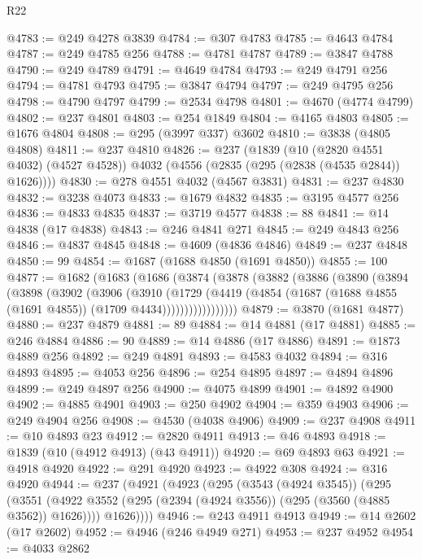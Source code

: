\begin{lexlean}{R22}
\begin{coremodule}
@4783 := @249 @4278 @3839
@4784 := @307 @4783
@4785 := @4643 @4784
@4787 := @249 @4785 @256
@4788 := @4781 @4787
@4789 := @3847 @4788
@4790 := @249 @4789
@4791 := @4649 @4784
@4793 := @249 @4791 @256
@4794 := @4781 @4793
@4795 := @3847 @4794
@4797 := @249 @4795 @256
@4798 := @4790 @4797
@4799 := @2534 @4798
@4801 := @4670 (@4774 @4799)
@4802 := @237 @4801
@4803 := @254 @1849
@4804 := @4165 @4803
@4805 := @1676 @4804
@4808 := @295 (@3997 @337) @3602
@4810 := @3838 (@4805 @4808)
@4811 := @237 @4810
@4826 := @237
    (@1839
      (@10 (@2820 @4551 @4032) (@4527 @4528))
      @4032
      (@4556 (@2835 (@295 (@2838 (@4535 @2844)) @1626))))
@4830 := @278 @4551 @4032 (@4567 @3831)
@4831 := @237 @4830
@4832 := @3238 @4073
@4833 := @1679 @4832
@4835 := @3195 @4577 @256
@4836 := @4833 @4835
@4837 := @3719 @4577
@4838 := 88
@4841 := @14 @4838 (@17 @4838)
@4843 := @246 @4841 @271
@4845 := @249 @4843 @256
@4846 := @4837 @4845
@4848 := @4609 (@4836 @4846)
@4849 := @237 @4848
@4850 := 99
@4854 := @1687 (@1688 @4850 (@1691 @4850))
@4855 := 100
@4877 := @1682
    (@1683
      (@1686
        (@3874
          (@3878
            (@3882
              (@3886
                (@3890
                  (@3894
                    (@3898
                      (@3902
                        (@3906
                          (@3910
                            (@1729
                              (@4419
                                (@4854
                                  (@1687 (@1688 @4855 (@1691 @4855)) (@1709 @4434)))))))))))))))))
@4879 := @3870 (@1681 @4877)
@4880 := @237 @4879
@4881 := 89
@4884 := @14 @4881 (@17 @4881)
@4885 := @246 @4884
@4886 := 90
@4889 := @14 @4886 (@17 @4886)
@4891 := @1873 @4889 @256
@4892 := @249 @4891
@4893 := @4583 @4032
@4894 := @316 @4893
@4895 := @4053 @256
@4896 := @254 @4895
@4897 := @4894 @4896
@4899 := @249 @4897 @256
@4900 := @4075 @4899
@4901 := @4892 @4900
@4902 := @4885 @4901
@4903 := @250 @4902
@4904 := @359 @4903
@4906 := @249 @4904 @256
@4908 := @4530 (@4038 @4906)
@4909 := @237 @4908
@4911 := @10 @4893 @23
@4912 := @2820 @4911
@4913 := @46 @4893
@4918 := @1839 (@10 (@4912 @4913) (@43 @4911))
@4920 := @69 @4893 @63
@4921 := @4918 @4920
@4922 := @291 @4920
@4923 := @4922 @308
@4924 := @316 @4920
@4944 := @237
    (@4921
      (@4923
        (@295
          (@3543 (@4924 @3545))
          (@295
            (@3551 (@4922 @3552 (@295 (@2394 (@4924 @3556)) (@295 (@3560 (@4885 @3562)) @1626))))
            @1626))))
@4946 := @243 @4911 @4913
@4949 := @14 @2602 (@17 @2602)
@4952 := @4946 (@246 @4949 @271)
@4953 := @237 @4952
@4954 := @4033 @2862

\end{coremodule}
\end{lexlean}
